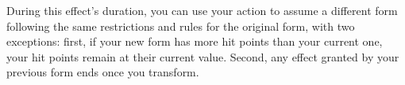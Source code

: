 During this effect’s duration, you can use your action to assume a different form following the same restrictions and rules for the original form, with two exceptions: first, if your new form has more hit points than your current one, your hit points remain at their current value. Second, any effect granted by your previous form ends once you transform. 













